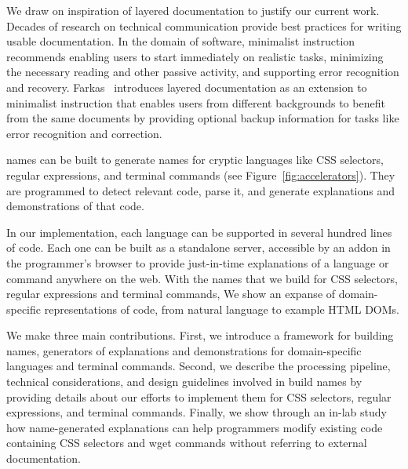 We draw on inspiration of layered documentation to justify our current work. 
Decades of research on technical communication provide best practices for writing usable documentation.
In the domain of software, minimalist instruction~\cite{carroll_nurnberg_1990} recommends enabling users to start immediately on realistic tasks, minimizing the necessary  reading and other passive activity, and supporting error recognition and recovery.
Farkas~\cite{farkas_layering_1998} introduces layered documentation as an extension to minimalist instruction that enables users from different backgrounds to benefit from the same documents by providing optional backup information for tasks like error recognition and correction.
\fi 
%
\begin{changes}
\Glspl{name} can be built to generate \glspl{name} for cryptic languages like CSS selectors, regular expressions, and terminal commands (see Figure~\ref{fig:accelerators}). 
They are programmed to detect relevant code, parse it, and generate explanations and demonstrations of that code. 
\end{changes}
In our implementation, each language can be supported in several hundred lines of code.
Each one can be built as a standalone server, accessible by an addon in the programmer's browser to provide just-in-time explanations of a language or command anywhere on the web.
 With the \glspl{name} that we build for CSS selectors, regular expressions and terminal commands, \fi We show an expanse of domain-specific representations of code, from natural language to example HTML DOMs.

We make three main contributions.
First, we introduce a framework for building \Glspl{name}, generators of explanations and demonstrations for domain-specific languages and terminal commands.
Second, we describe the processing pipeline, technical considerations, and design guidelines involved in build \glspl{name} by providing details about our efforts to implement them for CSS selectors, regular expressions, and terminal commands.
Finally, we show through an in-lab study how \gls{name}-generated explanations can help programmers modify existing code containing CSS selectors and wget commands without referring to external documentation.
